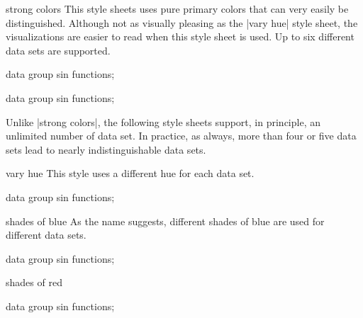 \begin{stylesheet}{strong colors}
  This style sheets uses pure primary colors that can very easily be
  distinguished. Although not as visually pleasing as the |vary hue|
  style sheet, the visualizations are easier to read when this style
  sheet is used. Up to six different data sets are supported.
\begin{codeexample}[width=10cm]
\tikz \datavisualization [
  visualize as smooth line/.list=
    {1,2,3,4,5,6,7,8},
  example visualization,
  style sheet=strong colors]
data group {sin functions};
\end{codeexample}
\begin{codeexample}[width=10cm]
\tikz \datavisualization [
  visualize as smooth line/.list=
    {1,2,3,4,5,6,7,8},
  example visualization,
  style sheet=strong colors,
  style sheet=vary dashing]
data group {sin functions};
\end{codeexample}
\end{stylesheet}


Unlike |strong colors|, the following style sheets support, in
principle, an unlimited number of data set. In practice, as always,
more than four or five data sets lead to nearly indistinguishable data
sets.

\begin{stylesheet}{vary hue}
  This style uses a different hue for each data set. 
\begin{codeexample}[width=10cm]
\tikz \datavisualization [
  visualize as smooth line/.list=
    {1,2,3,4,5,6,7,8},
  example visualization,
  style sheet=vary hue]
data group {sin functions};
\end{codeexample}
\end{stylesheet}

\begin{stylesheet}{shades of blue}
  As the name suggests, different shades of blue are used for different
  data sets.
\begin{codeexample}[width=10cm]
\tikz \datavisualization [
  visualize as smooth line/.list=
    {1,2,3,4,5,6,7,8},
  example visualization,
  style sheet=shades of blue]
data group {sin functions};
\end{codeexample}
\end{stylesheet}


\begin{stylesheet}{shades of red}
\begin{codeexample}[width=10cm]
\tikz \datavisualization [
  visualize as smooth line/.list=
    {1,2,3,4,5,6,7,8},
  example visualization,
  style sheet=shades of red]
data group {sin functions};
\end{codeexample}
\end{stylesheet}


